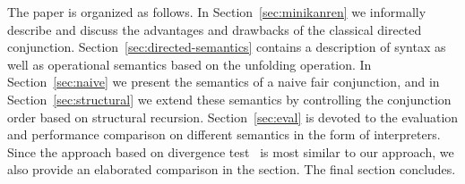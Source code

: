 The paper is organized as follows. In Section~\ref{sec:minikanren} we informally describe \mk and discuss the advantages and drawbacks of the classical directed conjunction. Section~\ref{sec:directed-semantics} contains a
description of \mk syntax as well as operational semantics based on the unfolding operation. In Section~\ref{sec:naive} we present the semantics of a naive fair conjunction,
and in Section~\ref{sec:structural} we extend these semantics by controlling the conjunction order based on structural recursion. Section~\ref{sec:eval} is devoted to the evaluation
and performance comparison on different semantics in the form of interpreters. Since the approach based on divergence test~\cite{fair:DivTest} is most similar to our approach, we also provide an elaborated comparison in the section. The final section concludes.
